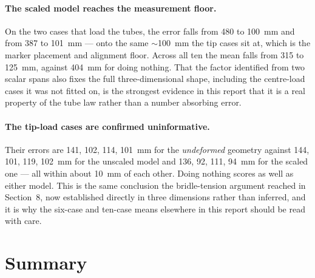 \documentclass[11pt,a4paper]{article}
\begin{document}
\paragraph{The scaled model reaches the measurement floor.} On the two cases
that load the tubes, the error falls from \SI{480}{} to \SI{100}{mm} and from
\SI{387}{} to \SI{101}{mm} --- onto the same $\sim$\SI{100}{mm} the tip cases
sit at, which is the marker placement and alignment floor. Across all ten the
mean falls from \SI{315}{} to \SI{125}{mm}, against \SI{404}{mm} for doing
nothing. That the factor identified from two scalar spans also fixes the full
three-dimensional shape, including the centre-load cases it was not fitted on,
is the strongest evidence in this report that it is a real property of the tube
law rather than a number absorbing error.

\paragraph{The tip-load cases are confirmed uninformative.} Their errors are
\SI{141}{}, \SI{102}{}, \SI{114}{}, \SI{101}{mm} for the \emph{undeformed}
geometry against \SI{144}{}, \SI{101}{}, \SI{119}{}, \SI{102}{mm} for the
unscaled model and \SI{136}{}, \SI{92}{}, \SI{111}{}, \SI{94}{mm} for the scaled
one --- all within about \SI{10}{mm} of each other. Doing nothing scores as well
as either model. This is the same conclusion the bridle-tension argument reached
in Section~8, now established directly in three dimensions rather than inferred,
and it is why the six-case and ten-case means elsewhere in this report should be
read with care.

\section{Summary}
\end{document}
